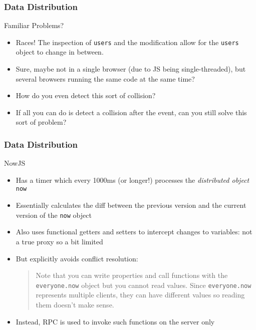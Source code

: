 \documentclass{beamer}
\begin{document}
\begin{frame}
  \frametitle{Data Distribution}

  \begin{block}{Familiar Problems?}
    \begin{itemize}
    \item
      Races! The inspection of \texttt{users} and the
      modification allow for the \texttt{users} object to
      change in between.
    \item
      Sure, maybe not in a single browser (due to JS being
      single-threaded), but several browsers running the same code at
      the same time?
    \item
      How do you even detect this sort of collision?
    \item
      If all you can do is detect a collision after the event, can you
      still solve this sort of problem?
    \end{itemize}
  \end{block}
\end{frame}

\begin{frame}
  \frametitle{Data Distribution}

  \begin{block}{NowJS}
    \begin{itemize}
    \item
      Has a timer which every 1000ms (or longer!) processes the {\em
        distributed object} \texttt{now}
    \item
      Essentially calculates the diff between the previous version and
      the current version of the \texttt{now} object
    \item
      Also uses functional getters and setters to intercept changes to
      variables: not a true proxy so a bit limited
    \item
      But explicitly avoids conflict resolution:
      \begin{quote}
        Note that you can write properties and call functions with the
        \texttt{everyone.now} object but you cannot read values. Since
        \texttt{everyone.now} represents multiple clients, they can
        have different values so reading them doesn't make sense.
      \end{quote}
    \item
      Instead, RPC is used to invoke such functions on the server only
    \end{itemize}
  \end{block}
\end{frame}
\end{document}

